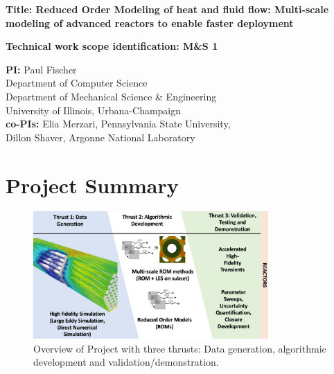 \parindent 0in
\parskip 0.1in

{\bf Title:  Reduced Order Modeling of heat and fluid flow: Multi-scale
modeling of advanced reactors to enable faster deployment }

{\bf Technical work scope identification: M\&S 1 }

{\bf PI:}
Paul Fischer \\
Department of Computer Science \\
Department of Mechanical Science \& Engineering \\
University of Illinois, Urbana-Champaign \\

{\bf co-PIs:}
Elia Merzari, Pennsylvania State University, \\
Dillon Shaver, Argonne National Laboratory \\

\section{Project Summary}


\begin{figure}[b!] \centering
    \includegraphics[width = 0.80\textwidth]{figs/overview.png}
    \caption{Overview of Project with three thrusts: Data generation,
             algorithmic development and validation/demonstration.  \label{fig:sum}}
\end{figure}

